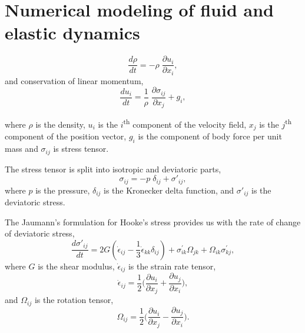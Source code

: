 \FloatBarrier%
\chapter{Numerical modeling of fluid and elastic dynamics}
\label{chap:ctvf}

\begin{equation}
  \label{eq:ce}
  \frac{d \rho}{d t} = - \rho \; \frac{\partial u_i}{\partial x_i},
\end{equation}
and conservation of linear momentum,
\begin{equation}
  \label{eq:me}
  \frac{d u_i}{d t} = \frac{1}{\rho} \; \frac{\partial \sigma_{ij}}{\partial x_j}
  + g_i,
\end{equation}

where $\rho$ is the density, $u_i$ is the $i$\textsuperscript{th} component of
the velocity field, $x_j$ is the $j$\textsuperscript{th} component of the
position vector, $g_i$ is the component of body force per unit mass and
$\sigma_{ij}$ is stress tensor.


The stress tensor is split into isotropic and deviatoric parts,
\begin{equation}
  \label{eq:stress_tensor_decomposition}
  \sigma_{ij} = - p \; \delta_{ij} + \sigma'_{ij},
\end{equation}
%
where $p$ is the pressure, $\delta_{ij}$ is the Kronecker delta function, and
$\sigma'_{ij}$ is the deviatoric stress.

The Jaumann's formulation for Hooke's stress provides us with the rate of
change of deviatoric stress,
\begin{equation}
  \label{eq:jaumann-stress-rate}
  \frac{d \sigma'_{ij}}{dt} = 2G (\dot{\epsilon}_{ij} - \frac{1}{3}
  \dot{\epsilon}_{kk} \delta_{ij}) + \sigma^{'}_{ik}  \Omega_{jk} +
  \Omega_{ik} \sigma^{'}_{kj},
\end{equation}
where $G$ is the shear modulus, $\dot{\epsilon}_{ij}$ is the strain rate tensor,
\begin{equation}
  \label{eq:strain-tensor}
  \dot{\epsilon}_{ij} = \frac{1}{2} \bigg(\frac{\partial u_i}{\partial x_j} +
  \frac{\partial u_j}{\partial x_i} \bigg),
\end{equation}
and $\Omega_{ij}$ is the rotation tensor,
\begin{equation}
  \label{eq:rotational-tensor}
  \Omega_{ij} = \frac{1}{2} \bigg(\frac{\partial u_i}{\partial x_j} -
  \frac{\partial u_j}{\partial x_i} \bigg).
\end{equation}

